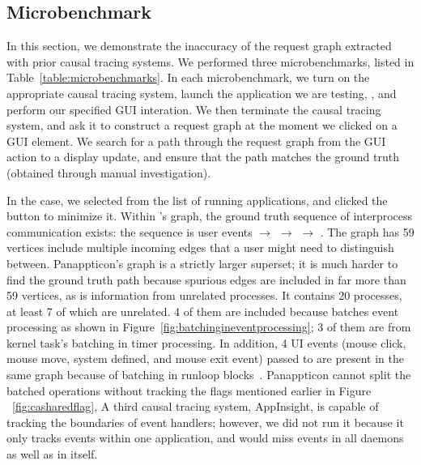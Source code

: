\subsection{Microbenchmark} \label{sec:toystudy}

In this section, we demonstrate the inaccuracy of the request graph extracted
with prior causal tracing systems. We performed three microbenchmarks, listed
in Table~\ref{table:microbenchmarks}. In each microbenchmark, we turn on the
appropriate causal tracing system, launch the application we are testing, \eg
{}, and perform our specified GUI interation. We then terminate the
causal tracing system, and ask it to construct a request graph at the moment we
clicked on a GUI element. We search for a path through the request graph from
the GUI action to a display update, and ensure that the path matches the ground
truth (obtained through manual investigation).

In the  case, we selected  from the list of running
applications, and clicked the  button to minimize it. Within \xxx's
graph, the ground truth sequence of interprocess communication exists: the
sequence is  user events $\rightarrow$ 
$\rightarrow$  $\rightarrow$ . The graph
has 59 vertices include multiple incoming edges that a user might need to
distinguish between. Panappticon's graph is a strictly larger superset; it is
much harder to find the ground truth path because spurious edges are included
in far more than 59 vertices, as is information from unrelated processes.
It contains 20 processes, at least 7 of which are unrelated. 4 of them are
included because  batches event processing as shown in
Figure~\ref{fig:batchingineventprocessing}; 3 of them are from kernel task's
batching in timer processing. In addition, 4 UI events (mouse click, mouse move,
system defined, and mouse exit event) passed to  are present in the
same graph because of batching in runloop blocks~\cite{runloop}. Panappticon
cannot split the batched operations without tracking the flags mentioned earlier
in Figure ~\ref{fig:casharedflag}, A third causal tracing system, AppInsight, is
capable of tracking the boundaries of event handlers; however, we did not run it
because it only tracks events within one application, and would miss events in
all daemons as well as in  itself.




